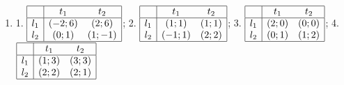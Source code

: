 \begin{problem}
\begin{enumerate}
\item 	1.  $\begin{array}{|c|cc|}  \hline {} & {t_{1} } & {t_{2} } \\  \hline {l_{1} } & {\left(-2;6\right)} & {\left(2;6\right)} \\ {l_{2} } & {\left(0;1\right)} & {\left(1;-1\right)} \\  \hline  \end{array}$; 2.  $\begin{array}{|c|cc|}  \hline {} & {t_{1} } & {t_{2} } \\  \hline {l_{1} } & {\left(1;1\right)} & {\left(1;1\right)} \\ {l_{2} } & {\left(-1;1\right)} & {\left(2;2\right)} \\  \hline  \end{array}$; 3.  $\begin{array}{|c|cc|}  \hline {} & {t_{1} } & {t_{2} } \\  \hline {l_{1} } & {\left(2;0\right)} & {\left(0;0\right)} \\ {l_{2} } & {\left(0;1\right)} & {\left(1;2\right)} \\  \hline  \end{array}$; 4.  $\begin{array}{|c|cc|}  \hline {} & {t_{1} } & {t_{2} } \\  \hline {l_{1} } & {\left(1;3\right)} & {\left(3;3\right)} \\ {l_{2} } & {\left(2;2\right)} & {\left(2;1\right)} \\  \hline  \end{array}$ \\

\end{enumerate}
\end{problem}
